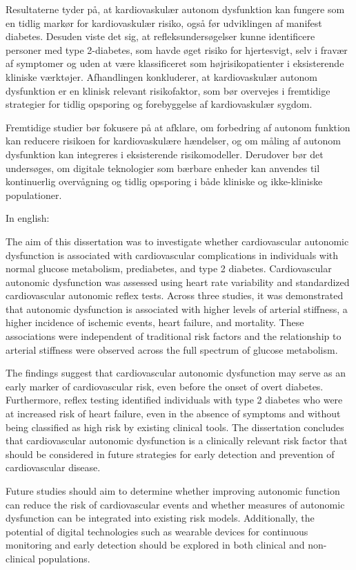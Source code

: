 \documentclass[
  a4paper,
  headsepline=true,
  open=any]{scrbook}
\begin{document}
Resultaterne tyder på, at kardiovaskulær autonom dysfunktion kan fungere
som en tidlig markør for kardiovaskulær risiko, også før udviklingen af
manifest diabetes. Desuden viste det sig, at refleksundersøgelser kunne
identificere personer med type 2-diabetes, som havde øget risiko for
hjertesvigt, selv i fravær af symptomer og uden at være klassificeret
som højrisikopatienter i eksisterende kliniske værktøjer. Afhandlingen
konkluderer, at kardiovaskulær autonom dysfunktion er en klinisk
relevant risikofaktor, som bør overvejes i fremtidige strategier for
tidlig opsporing og forebyggelse af kardiovaskulær sygdom.

Fremtidige studier bør fokusere på at afklare, om forbedring af autonom
funktion kan reducere risikoen for kardiovaskulære hændelser, og om
måling af autonom dysfunktion kan integreres i eksisterende
risikomodeller. Derudover bør det undersøges, om digitale teknologier
som bærbare enheder kan anvendes til kontinuerlig overvågning og tidlig
opsporing i både kliniske og ikke-kliniske populationer.

In english:

The aim of this dissertation was to investigate whether cardiovascular
autonomic dysfunction is associated with cardiovascular complications in
individuals with normal glucose metabolism, prediabetes, and type 2
diabetes. Cardiovascular autonomic dysfunction was assessed using heart
rate variability and standardized cardiovascular autonomic reflex tests.
Across three studies, it was demonstrated that autonomic dysfunction is
associated with higher levels of arterial stiffness, a higher incidence
of ischemic events, heart failure, and mortality. These associations
were independent of traditional risk factors and the relationship to
arterial stiffness were observed across the full spectrum of glucose
metabolism.

The findings suggest that cardiovascular autonomic dysfunction may serve
as an early marker of cardiovascular risk, even before the onset of
overt diabetes. Furthermore, reflex testing identified individuals with
type 2 diabetes who were at increased risk of heart failure, even in the
absence of symptoms and without being classified as high risk by
existing clinical tools. The dissertation concludes that cardiovascular
autonomic dysfunction is a clinically relevant risk factor that should
be considered in future strategies for early detection and prevention of
cardiovascular disease.

Future studies should aim to determine whether improving autonomic
function can reduce the risk of cardiovascular events and whether
measures of autonomic dysfunction can be integrated into existing risk
models. Additionally, the potential of digital technologies such as
wearable devices for continuous monitoring and early detection should be
explored in both clinical and non-clinical populations.
\end{document}
